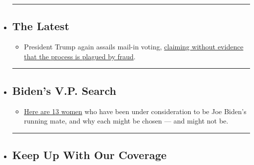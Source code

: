 \begin{itemize}
\item
  \begin{center}\rule{0.5\linewidth}{\linethickness}\end{center}

  \hypertarget{the-latest}{%
  \subsection{The Latest}\label{the-latest}}

  \begin{itemize}
  \tightlist
  \item
    President Trump again assails mail-in voting,
    \href{https://www.nytimes3xbfgragh.onion/2020/08/03/us/politics/trump-mail-in-voting.html?action=click\&pgtype=Article\&state=default\&region=BELOW_MAIN_CONTENT\&context=storylines_guide}{claiming
    without evidence that the process is plagued by fraud}.
  \end{itemize}
\item
  \begin{center}\rule{0.5\linewidth}{\linethickness}\end{center}

  \hypertarget{bidens-vp-search}{%
  \subsection{Biden's V.P. Search}\label{bidens-vp-search}}

  \begin{itemize}
  \tightlist
  \item
    \href{https://www.nytimes3xbfgragh.onion/article/biden-vice-president-2020.html?action=click\&pgtype=Article\&state=default\&region=BELOW_MAIN_CONTENT\&context=storylines_guide}{Here
    are 13 women} who have been under consideration to be Joe Biden's
    running mate, and why each might be chosen --- and might not be.
  \end{itemize}
\item
  \begin{center}\rule{0.5\linewidth}{\linethickness}\end{center}

  \hypertarget{keep-up-with-our-coverage}{%
  \subsection{Keep Up With Our
  Coverage}\label{keep-up-with-our-coverage}}


\end{itemize}
